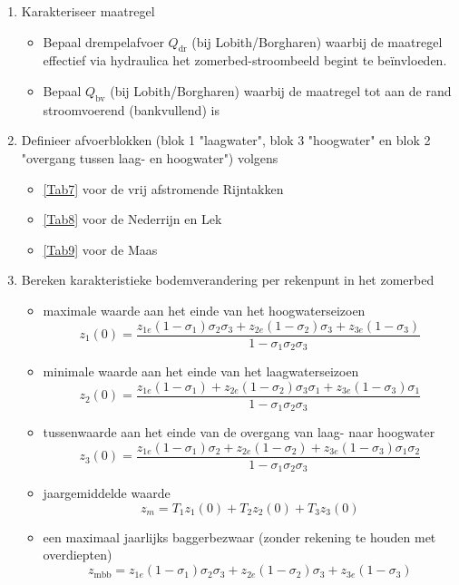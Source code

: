 \begin{enumerate}
\item Karakteriseer maatregel

\begin{itemize}
\item Bepaal drempelafvoer $Q_\text{dr}$ (bij Lobith/Borgharen) waarbij de maatregel effectief via hydraulica het zomerbed-stroombeeld begint te be\"invloeden.

\item Bepaal $Q_\text{bv}$ (bij Lobith/Borgharen) waarbij de maatregel tot aan de rand stroomvoerend (bankvullend) is
\end{itemize}

\item Definieer afvoerblokken (blok 1 "laagwater", blok 3 "hoogwater" en blok 2 "overgang tussen laag- en hoogwater") volgens

\begin{itemize}
\item \autoref{Tab7} voor de vrij afstromende Rijntakken
\item \autoref{Tab8} voor de Nederrijn en Lek
\item \autoref{Tab9} voor de Maas
\end{itemize}

\item Bereken karakteristieke bodemverandering per rekenpunt in het zomerbed

\begin{itemize}
\item maximale waarde  aan het einde van het hoogwaterseizoen
\begin{equation}
z_1(0) = \frac{z_{1e} (1-\sigma_1) \sigma_2 \sigma_3 + z_{2e} (1-\sigma_2) \sigma_3 + z_{3e} (1-\sigma_3)}{1 - \sigma_1 \sigma_2 \sigma_3}
\end{equation}
\item minimale waarde  aan het einde van het laagwaterseizoen
\begin{equation}
z_2(0) = \frac{z_{1e} (1-\sigma_1) + z_{2e} (1-\sigma_2) \sigma_3 \sigma_1 + z_{3e} (1-\sigma_3) \sigma_1}{1 - \sigma_1 \sigma_2 \sigma_3}
\end{equation}
\item tussenwaarde  aan het einde van de overgang van laag- naar hoogwater
\begin{equation}
z_3(0) = \frac{z_{1e} (1-\sigma_1) \sigma_2 + z_{2e} (1-\sigma_2) + z_{3e} (1-\sigma_3) \sigma_1 \sigma_2}{1 - \sigma_1 \sigma_2 \sigma_3}
\end{equation}
\item jaargemiddelde waarde 
\begin{equation}
z_m = T_1 z_1(0) + T_2 z_2(0) + T_3 z_3(0)
\end{equation}
\item een maximaal jaarlijks baggerbezwaar (zonder rekening te houden met overdiepten)
\begin{equation}
z_\text{mbb} = z_{1e} (1-\sigma_1) \sigma_2 \sigma_3 + z_{2e} (1-\sigma_2) \sigma_3 + z_{3e} (1-\sigma_3)
\end{equation}
\end{itemize}


\end{enumerate}
